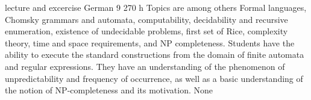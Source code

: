 {lecture and excercise}
{German}
{9}
{270 h}
{Topics are among others Formal languages, Chomsky grammars and automata, computability, decidability and recursive enumeration, existence of undecidable problems, first set of Rice, complexity theory, time and space requirements, and NP completeness.}
{Students have the ability to execute the standard constructions from the domain of finite automata and regular expressions. They have an understanding of the phenomenon of unpredictability and frequency of occurrence, as well as a basic understanding of the notion of NP-completeness and its motivation.}
{None}